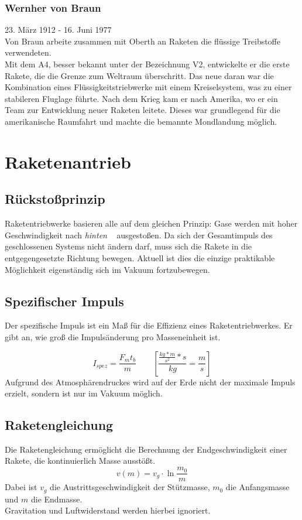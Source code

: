 \documentclass[12pt,a4paper]{article}
\begin{document}
\subsubsection{Wernher von Braun}
23. März 1912 - 16. Juni 1977\\
Von Braun arbeite zusammen mit Oberth an Raketen die flüssige Treibstoffe verwendeten.\\
Mit dem A4, besser bekannt unter der Bezeichnung V2, entwickelte er die erste Rakete, die die Grenze zum Weltraum überschritt. Das neue daran war die Kombination eines  Flüssigkeitstriebwerke mit einem Kreiselsystem, was zu einer stabileren Fluglage führte. Nach dem Krieg kam er nach Amerika, wo er ein Team zur Entwicklung neuer Raketen leitete. Dieses war grundlegend für die amerikanische Raumfahrt und machte die bemannte Mondlandung möglich.\\ 
\section{Raketenantrieb}
\subsection{Rückstoßprinzip}
Raketentriebwerke basieren alle auf dem gleichen Prinzip: Gase werden mit hoher Geschwindigkeit nach \glqq \textit{hinten} \grqq ~ ausgestoßen. Da sich der Gesamtimpuls des geschlossenen Systems nicht ändern darf, muss sich die Rakete  in die entgegengesetzte Richtung bewegen. Aktuell ist dies die einzige praktikable Möglichkeit eigenständig sich im Vakuum fortzubewegen.
\subsection{Spezifischer Impuls}
Der spezifische Impuls ist ein Maß für die Effizienz eines Raketentriebwerkes. Er gibt an, wie groß die Impulsänderung pro Masseneinheit ist. 

\begin{equation}
I_{spez} = \frac{F_mt_b}{m} \qquad[\frac{\frac{kg*m}{s^2}*s}{kg} = \frac{m}{s}]
\end{equation}
Aufgrund des Atmosphärendruckes wird auf der Erde nicht der maximale Impuls erzielt, sondern ist nur im Vakuum möglich.
\subsection{Raketengleichung}
Die Raketengleichung ermöglicht die Berechnung der Endgeschwindigkeit einer Rakete, die kontinuierlich Masse ausstößt.
\begin{equation}
v(m) = v_g \cdot \ln \frac{m_0}{m}
\end{equation}
Dabei ist $v_g$ die Austrittsgeschwindigkeit der Stützmasse, $m_0$ die Anfangsmasse und $m$ die Endmasse.\\
Gravitation und Luftwiderstand werden hierbei ignoriert.
\end{document}

